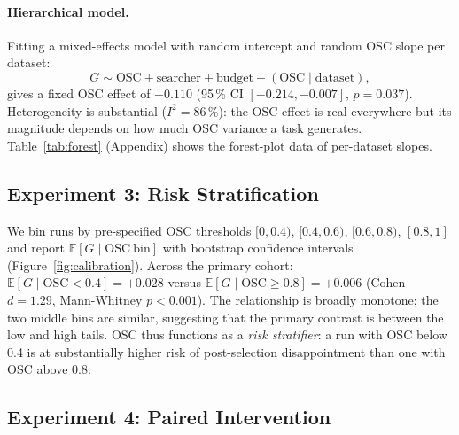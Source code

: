 \documentclass[twoside]{article}
\newcommand{\OSC}{\mathrm{OSC}}
\newcommand{\bE}{\mathbb{E}}
\begin{document}
\paragraph{Hierarchical model.}
Fitting a mixed-effects model with random intercept and random OSC slope
per dataset:
\begin{equation*}
  G \sim \OSC + \text{searcher} + \text{budget}
    + (\OSC \mid \mathrm{dataset}),
\end{equation*}
gives a fixed OSC effect of $-0.110$ (95\,\% CI $[-0.214, -0.007]$,
$p = 0.037$). Heterogeneity is substantial ($I^2 = 86\,\%$): the OSC
effect is real everywhere but its magnitude depends on how much OSC
variance a task generates. Table~\ref{tab:forest} (Appendix) shows the forest-plot data
of per-dataset slopes.

\subsection{Experiment 3: Risk Stratification}
\label{sec:calibration}

We bin runs by pre-specified OSC thresholds $[0, 0.4)$, $[0.4, 0.6)$,
$[0.6, 0.8)$, $[0.8, 1]$ and report $\bE[G \mid \mathrm{OSC\ bin}]$
with bootstrap confidence intervals (Figure~\ref{fig:calibration}).
Across the primary cohort: $\bE[G \mid \mathrm{OSC} < 0.4] = +0.028$
versus $\bE[G \mid \mathrm{OSC} \ge 0.8] = +0.006$ (Cohen $d = 1.29$,
Mann-Whitney $p < 0.001$). The relationship is broadly monotone; the
two middle bins are similar, suggesting that the primary contrast is
between the low and high tails. OSC thus functions as a
\emph{risk stratifier}: a run with OSC below 0.4 is at substantially
higher risk of post-selection disappointment than one with OSC above 0.8.

\subsection{Experiment 4: Paired Intervention}
\label{sec:intervention}
\end{document}
